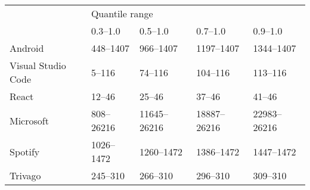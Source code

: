 \begin{tabular}{lllll}
\toprule
 & \multicolumn{4}{l}{Quantile range} \\
 & \numrange{0.3}{1.0} & \numrange{0.5}{1.0} & \numrange{0.7}{1.0} & \numrange{0.9}{1.0} \\
\midrule
Android & \numrange{448}{1407} & \numrange{966}{1407} & \numrange{1197}{1407} & \numrange{1344}{1407} \\
Visual Studio Code & \numrange{5}{116} & \numrange{74}{116} & \numrange{104}{116} & \numrange{113}{116} \\
React & \numrange{12}{46} & \numrange{25}{46} & \numrange{37}{46} & \numrange{41}{46} \\
Microsoft & \numrange{808}{26216} & \numrange{11645}{26216} & \numrange{18887}{26216} & \numrange{22983}{26216} \\
Spotify & \numrange{1026}{1472} & \numrange{1260}{1472} & \numrange{1386}{1472} & \numrange{1447}{1472} \\
Trivago & \numrange{245}{310} & \numrange{266}{310} & \numrange{296}{310} & \numrange{309}{310} \\
\bottomrule
\end{tabular}
